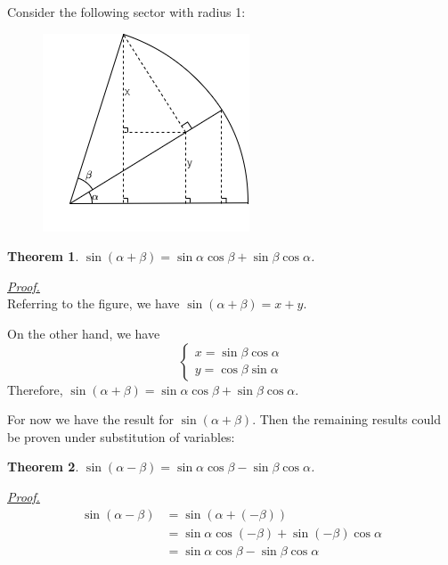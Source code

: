 \documentclass[12pt]{article}
\newtheorem*{theorem}{Theorem}
\renewenvironment{proof}[1][Proof]{\begin{snugshade*} \underline{\textit{{#1}.}}\\}{\hfill \qedsymbol \end{snugshade*}}
\begin{document}
    Consider the following sector with radius 1:
    \begin{figure}[H]
        \centering
        \includegraphics[scale=0.8]{ab.png}
    \end{figure}

    \begin{theorem}
        $\sin(\alpha+\beta)=\sin{\alpha}\cos{\beta}+\sin{\beta}\cos{\alpha}$.
    \end{theorem}

    \begin{proof}
        Referring to the figure, we have $\sin(\alpha+\beta)=x+y$.
        
        On the other hand, we have $$\begin{cases}
            x=\sin{\beta}\cos{\alpha}\\y=\cos{\beta}\sin{\alpha}
        \end{cases}$$ Therefore, $\sin(\alpha+\beta)=\sin{\alpha}\cos{\beta}+\sin{\beta}\cos{\alpha}$.
    \end{proof}

    For now we have the result for $\sin(\alpha+\beta)$. Then the remaining results could be proven under substitution of variables:
    
    \begin{theorem}
        $\sin(\alpha-\beta)=\sin{\alpha}\cos{\beta}-\sin{\beta}\cos{\alpha}$.
    \end{theorem}

    \begin{proof}
        \begin{align*}
            \sin(\alpha-\beta)&=\sin(\alpha+(-\beta))\\&=\sin{\alpha}\cos(-\beta)+\sin(-\beta)\cos{\alpha}\\&=\sin{\alpha}\cos{\beta}-\sin{\beta}\cos{\alpha}
        \end{align*}
    \end{proof}
\end{document}
